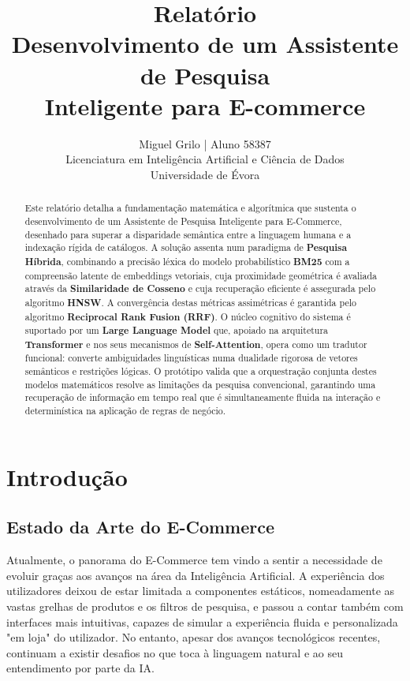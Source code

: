 \documentclass[runningheads]{llncs}
\title{Relatório\\Desenvolvimento de um Assistente de Pesquisa \\Inteligente para E-commerce}
\author{Miguel Grilo | Aluno 58387\\Licenciatura em Inteligência Artificial e Ciência de Dados\\Universidade de Évora}
\institute{IMPACT Commerce \\ Orientadores: José Barbosa \& Cristina Silva}
\begin{document}
\maketitle
\begin{abstract}
Este relatório detalha a fundamentação matemática e algorítmica que sustenta o desenvolvimento de um Assistente de Pesquisa Inteligente para E-Commerce, desenhado para superar a disparidade semântica entre a linguagem humana e a indexação rígida de catálogos. A solução assenta num paradigma de \textbf{Pesquisa Híbrida}, combinando a precisão léxica do modelo probabilístico \textbf{BM25} com a compreensão latente de embeddings vetoriais, cuja proximidade geométrica é avaliada através da \textbf{Similaridade de Cosseno} e cuja recuperação eficiente é assegurada pelo algoritmo \textbf{HNSW}. A convergência destas métricas assimétricas é garantida pelo algoritmo \textbf{Reciprocal Rank Fusion (RRF)}. O núcleo cognitivo do sistema é suportado por um \textbf{Large Language Model} que, apoiado na arquitetura \textbf{Transformer} e nos seus mecanismos de \textbf{Self-Attention}, opera como um tradutor funcional: converte ambiguidades linguísticas numa dualidade rigorosa de vetores semânticos e restrições lógicas. O protótipo valida que a orquestração conjunta destes modelos matemáticos resolve as limitações da pesquisa convencional, garantindo uma recuperação de informação em tempo real que é simultaneamente fluida na interação e determinística na aplicação de regras de negócio.

\end{abstract}

\section*{Introdução}
\subsection*{Estado da Arte do E-Commerce}
Atualmente, o panorama do E-Commerce tem vindo a sentir a necessidade de evoluir graças aos avanços na área da Inteligência Artificial. A experiência dos utilizadores deixou de estar limitada a componentes estáticos, nomeadamente as vastas grelhas de produtos e os filtros de pesquisa, e passou a contar também com interfaces mais intuitivas, capazes de simular a experiência fluida e personalizada "em loja" do utilizador. No entanto, apesar dos avanços tecnológicos recentes, continuam a existir desafios no que toca à linguagem natural e ao seu entendimento por parte da IA.
\end{document}
